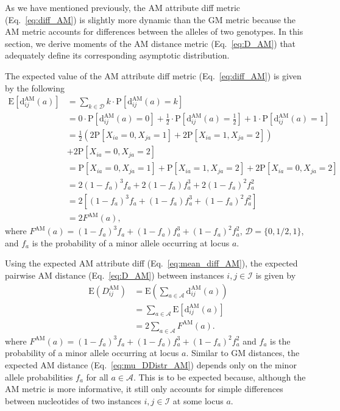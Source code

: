 \documentclass[10pt,letterpaper]{article}
\begin{document}
As we have mentioned previously, the AM attribute diff metric (Eq.~\ref{eq:diff_AM}) is slightly more dynamic than the GM metric because the AM metric accounts for differences between the alleles of two genotypes. In this section, we derive moments of the AM distance metric (Eq.~\ref{eq:D_AM}) that adequately define its corresponding asymptotic distribution.

The expected value of the AM attribute diff metric (Eq.~\ref{eq:diff_AM}) is given by the following
%
\begin{equation}\label{eq:mean_diff_AM}
\begin{aligned}
\text{E}\left[\text{d}^\text{AM}_{ij}(a)\right] &= \sum_{k \in \mathcal{D}} k \cdot \text{P}\left[\text{d}^\text{AM}_{ij}(a) = k\right] \\
&= 0 \cdot \text{P}\left[\text{d}^\text{AM}_{ij}(a) = 0\right] + \frac{1}{2} \cdot \text{P}\left[\text{d}^\text{AM}_{ij}(a) = \frac{1}{2}\right] + 1 \cdot \text{P}\left[\text{d}^\text{AM}_{ij}(a) = 1\right] \\
&= \frac{1}{2}\left(2 \text{P}\left[X_{ia} = 0, X_{ja} = 1\right] + 2 \text{P}\left[X_{ia} = 1, X_{ja} = 2\right]\right) \\
&+ 2 \text{P}\left[X_{ia} = 0, X_{ja} = 2\right] \\
&= \text{P}\left[X_{ia} = 0, X_{ja} = 1\right] + \text{P}\left[X_{ia} = 1, X_{ja} = 2\right] + 2 \text{P}\left[X_{ia} = 0, X_{ja} = 2\right] \\
&= 2(1 - f_a)^3f_a + 2(1 - f_a)f^3_a + 2(1 - f_a)^2 f^2_a \\
&= 2\left[(1 - f_a)^3f_a + (1 - f_a)f^3_a + (1 - f_a)^2 f^2_a\right] \\
&= 2F^\text{AM}(a),
\end{aligned}
\end{equation}
%
where $F^\text{AM}(a) = (1 - f_a)^3f_a + (1 - f_a)f^3_a + (1 - f_a)^2 f^2_a$, $\mathcal{D} = \{0,1/2,1\}$, and $f_a$ is the probability of a minor allele occurring at locus $a$.

Using the expected AM attribute diff (Eq.~\ref{eq:mean_diff_AM}), the expected pairwise AM distance (Eq.~\ref{eq:D_AM}) between instances $i,j \in \mathcal{I}$ is given by
%
\begin{equation}\label{eq:mu_DDistr_AM}
\begin{aligned}
\text{E}\left(D^\text{AM}_{ij}\right) &= \text{E}\left(\sum_{a \in \mathcal{A}} \text{d}^\text{AM}_{ij}(a)\right) \\
&= \sum_{a \in \mathcal{A}} \text{E}\left[\text{d}^\text{AM}_{ij}(a)\right] \\
&= 2 \sum_{a \in \mathcal{A}} F^\text{AM}(a).
\end{aligned}
\end{equation}
%
where $F^\text{AM}(a) = (1 - f_a)^3f_a + (1 - f_a)f^3_a + (1 - f_a)^2 f^2_a$ and $f_a$ is the probability of a minor allele occurring at locus $a$. Similar to GM distances, the expected AM distance (Eq.~\ref{eq:mu_DDistr_AM}) depends only on the minor allele probabilities $f_a$ for all $a \in \mathcal{A}$. This is to be expected because, although the AM metric is more informative, it still only accounts for simple differences between nucleotides of two instances $i,j \in \mathcal{I}$ at some locus $a$.
\end{document}
